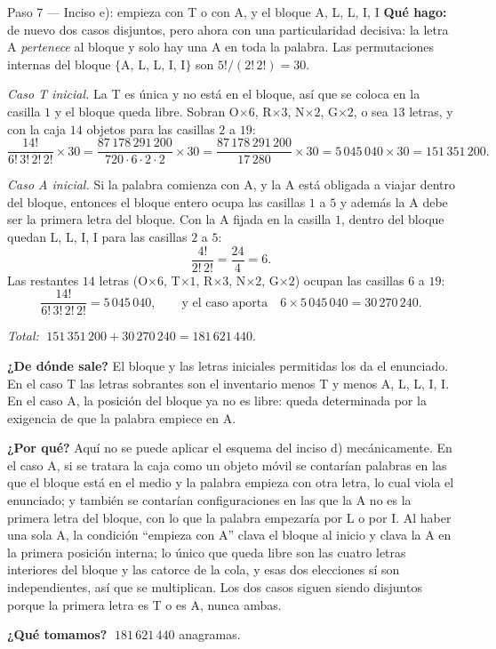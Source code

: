 \documentclass[11pt]{article}
\begin{document}
\begin{paso}{Paso 7 --- Inciso e): empieza con T o con A, y el bloque A, L, L, I, I}
\textbf{Qué hago:} de nuevo dos casos disjuntos, pero ahora con una particularidad decisiva: la letra A
\emph{pertenece} al bloque y solo hay una A en toda la palabra. Las permutaciones internas del bloque
$\{$A, L, L, I, I$\}$ son $5!/(2!\,2!)=30$.

\medskip
\emph{Caso T inicial.} La T es única y no está en el bloque, así que se coloca en la casilla $1$ y el
bloque queda libre. Sobran O$\times6$, R$\times3$, N$\times2$, G$\times2$, o sea $13$ letras, y con la caja
$14$ objetos para las casillas $2$ a $19$:
\[
\frac{14!}{6!\,3!\,2!\,2!}\times30=\frac{87\,178\,291\,200}{720\cdot6\cdot2\cdot2}\times30
=\frac{87\,178\,291\,200}{17\,280}\times30=5\,045\,040\times30=151\,351\,200 .
\]

\medskip
\emph{Caso A inicial.} Si la palabra comienza con A, y la A está obligada a viajar dentro del bloque,
entonces el bloque entero ocupa las casillas $1$ a $5$ y además la A debe ser la primera letra del bloque.
Con la A fijada en la casilla $1$, dentro del bloque quedan L, L, I, I para las casillas $2$ a $5$:
\[
\frac{4!}{2!\,2!}=\frac{24}{4}=6 .
\]
Las restantes $14$ letras (O$\times6$, T$\times1$, R$\times3$, N$\times2$, G$\times2$) ocupan las casillas
$6$ a $19$:
\[
\frac{14!}{6!\,3!\,2!\,2!}=5\,045\,040 ,
\qquad\text{y el caso aporta}\quad 6\times 5\,045\,040=30\,270\,240 .
\]

\medskip
\emph{Total:} $\;151\,351\,200+30\,270\,240=181\,621\,440 .$

\textbf{¿De dónde sale?} El bloque y las letras iniciales permitidas los da el enunciado. En el caso T las
letras sobrantes son el inventario menos T y menos A, L, L, I, I. En el caso A, la posición del bloque ya
no es libre: queda determinada por la exigencia de que la palabra empiece en A.

\textbf{¿Por qué?} Aquí no se puede aplicar el esquema del inciso d) mecánicamente. En el caso A, si se
tratara la caja como un objeto móvil se contarían palabras en las que el bloque está en el medio y la
palabra empieza con otra letra, lo cual viola el enunciado; y también se contarían configuraciones en las
que la A no es la primera letra del bloque, con lo que la palabra empezaría por L o por I. Al haber una
sola A, la condición ``empieza con A'' clava el bloque al inicio y clava la A en la primera posición
interna; lo único que queda libre son las cuatro letras interiores del bloque y las catorce de la cola, y
esas dos elecciones sí son independientes, así que se multiplican. Los dos casos siguen siendo disjuntos
porque la primera letra es T o es A, nunca ambas.

\textbf{¿Qué tomamos?} $\;181\,621\,440$ anagramas.
\end{paso}
\end{document}
